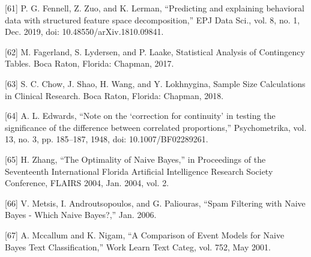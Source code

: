 \let\LaTeXcline\cline\documentclass[sn-mathphys-num]{sn-jnl}\let\cline\LaTeXcline
\begin{document}
[61] P. G. Fennell, Z. Zuo, and K. Lerman, “Predicting and explaining behavioral data with structured feature space decomposition,” EPJ Data Sci., vol. 8, no. 1, Dec. 2019, doi: 10.48550/arXiv.1810.09841.

[62] M. Fagerland, S. Lydersen, and P. Laake, Statistical Analysis of Contingency Tables. Boca Raton, Florida: Chapman, 2017.

[63] S. C. Chow, J. Shao, H. Wang, and Y. Lokhnygina, Sample Size Calculations in Clinical Research. Boca Raton, Florida: Chapman, 2018.

[64] A. L. Edwards, “Note on the ‘correction for continuity’ in testing the significance of the difference between correlated proportions,” Psychometrika, vol. 13, no. 3, pp. 185–187, 1948, doi: 10.1007/BF02289261.

[65] H. Zhang, “The Optimality of Naive Bayes,” in Proceedings of the Seventeenth International Florida Artificial Intelligence Research Society Conference, FLAIRS 2004, Jan. 2004, vol. 2.

[66] V. Metsis, I. Androutsopoulos, and G. Paliouras, “Spam Filtering with Naive Bayes - Which Naive Bayes?,” Jan. 2006.

[67] A. Mccallum and K. Nigam, “A Comparison of Event Models for Naive Bayes Text Classification,” Work Learn Text Categ, vol. 752, May 2001.
\end{document}
